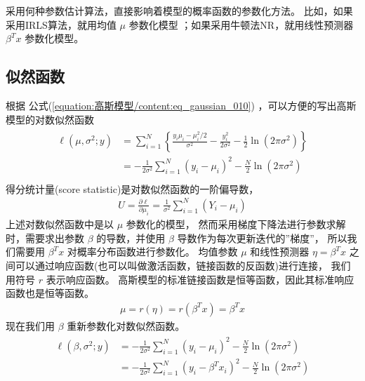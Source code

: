 \documentclass[letterpaper,10pt,english]{sphinxmanual}
\begin{document}
采用何种参数估计算法，直接影响着模型的概率函数的参数化方法。
比如，如果采用IRLS算法，就用均值 \(\mu\) 参数化模型
；如果采用牛顿法N\sphinxhyphen{}R，就用线性预测器 \(\beta^T x\) 参数化模型。


\subsection{似然函数}
\label{\detokenize{_u9ad8_u65af_u6a21_u578b/content:id6}}
根据 公式(\ref{equation:高斯模型/content:eq_gaussian_010}) ，可以方便的写出高斯模型的对数似然函数
\begin{align}\label{equation:高斯模型/content:高斯模型/content:7}\!\begin{aligned}
\ell(\mu,\sigma^2;y)
&= \sum_{i=1}^N \left \{ \frac{y_i \mu_i - \mu_i^2/2}{\sigma^2} -
 \frac{y_i^2}{2\sigma^2} - \frac{1}{2} \ln (2\pi\sigma^2) \right \}\\
&= -\frac{1}{2\sigma^2} \sum_{i=1}^N (y_i - \mu_i)^2  -  \frac{N}{2} \ln (2\pi\sigma^2)\\
\end{aligned}\end{align}
得分统计量(score statistic)是对数似然函数的一阶偏导数，
\begin{equation}\label{equation:高斯模型/content:高斯模型/content:8}
\begin{split}U = \frac{\partial \ell}{ \partial \mu_i} = \frac{1}{\sigma^2} \sum_{i=1}^N (Y_i-\mu_i)\end{split}
\end{equation}
上述对数似然函数中是以 \(\mu\) 参数化的模型，
然而采用梯度下降法进行参数求解时，需要求出参数 \(\beta\)
的导数，并使用 \(\beta\) 导数作为每次更新迭代的”梯度”，
所以我们需要用 \(\beta^Tx\) 对概率分布函数进行参数化。
均值参数 \(\mu\) 和线性预测器 \(\eta=\beta^Tx\)
之间可以通过响应函数(也可以叫做激活函数，链接函数的反函数)进行连接，
我们用符号 \(r\) 表示响应函数。
高斯模型的标准链接函数是恒等函数，因此其标准响应函数也是恒等函数。
\begin{equation}\label{equation:高斯模型/content:高斯模型/content:9}
\begin{split}\mu = r(\eta)=r(\beta^Tx)=\beta^Tx\end{split}
\end{equation}
现在我们用 \(\beta\) 重新参数化对数似然函数。
\begin{align}\label{equation:高斯模型/content:高斯模型/content:10}\!\begin{aligned}
\ell(\beta,\sigma^2;y) &= -\frac{1}{2\sigma^2} \sum_{i=1}^N (y_i - \mu_i)^2  -  \frac{N}{2} \ln (2\pi\sigma^2)\\
&= -\frac{1}{2\sigma^2} \sum_{i=1}^N (y_i - \beta^T x_i)^2  -  \frac{N}{2} \ln (2\pi\sigma^2)\\
\end{aligned}\end{align}
\end{document}
